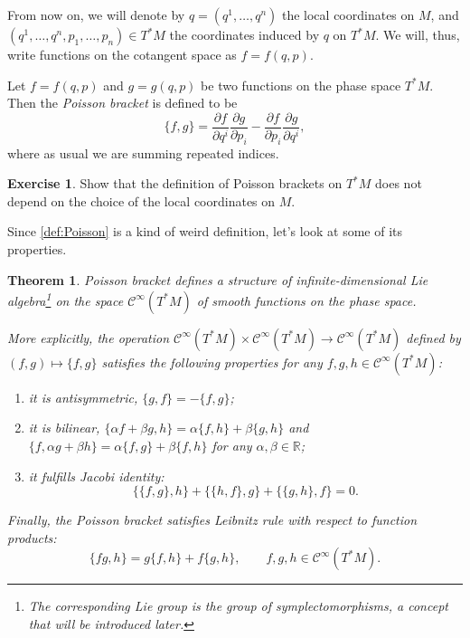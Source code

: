 \documentclass[english,fontsize=11pt,paper=b5]{scrbook}
\newtheorem{theorem}{Theorem}[chapter]
\theoremstyle{definition}
\newtheorem{exercise}{Exercise}[chapter]
\begin{document}
    From now on, we will denote by $q = (q^1, \ldots, q^n)$ the local coordinates on $M$, and $(q^1, \ldots, q^n, p_1, \ldots, p_n)\in T^*M$ the coordinates induced by $q$ on $T^*M$. We will, thus, write functions on the cotangent space as $f=f(q,p)$.

    \begin{tcolorbox}
      Let $f=f(q,p)$ and $g=g(q,p)$ be two functions on the phase space $T^*M$.
      Then the \emph{Poisson bracket} is defined to be
      \begin{equation}\label{def:Poisson}
        \big\{f,g\big\} = \frac{\partial f}{\partial q^i}\frac{\partial g}{\partial p_i} - \frac{\partial f}{\partial p_i}\frac{\partial g}{\partial q^i},
      \end{equation}
      where as usual we are summing repeated indices.
    \end{tcolorbox}

    \begin{exercise}
      Show that the definition of Poisson brackets on $T^*M$ does not depend on the choice of the local coordinates on $M$.
    \end{exercise}

    Since \ref{def:Poisson} is a kind of weird definition, let's look at some of its properties.

    \begin{theorem}\label{thm:PoissonLieAlgebra}
      Poisson bracket defines a structure of infinite-dimensional Lie algebra\footnote{The corresponding Lie group is the group of symplectomorphisms, a concept that will be introduced later.} on the space $\mathcal{C}^\infty(T^*M)$ of smooth functions on the phase space.

      More explicitly, the operation $\mathcal{C}^\infty(T^*M)\times \mathcal{C}^\infty(T^*M) \to \mathcal{C}^\infty(T^*M)$ defined by $(f,g) \mapsto \big\{f,g\big\}$ satisfies the following properties for any $f,g,h \in \mathcal{C}^\infty(T^*M)$:
      \begin{enumerate}
        \item it is antisymmetric, $\big\{g,f\big\} = - \big\{f,g\big\}$;
        \item it is bilinear, $\big\{\alpha f + \beta g, h\big\} = \alpha\big\{f,h\big\} + \beta\big\{g,h\big\}$ and $\big\{f, \alpha g + \beta h\big\} = \alpha\big\{f,g\big\} + \beta\big\{f,h\big\}$ for any $\alpha, \beta \in\mathbb{R}$;
        \item it fulfills \emph{Jacobi identity}:
          \begin{equation}\label{eq:JacobiId}
            \big\{\big\{f,g\big\},h\big\} + \big\{\big\{h,f\big\},g\big\} + \big\{\big\{g,h\big\},f\big\} = 0.
          \end{equation}
      \end{enumerate}
      Finally, the Poisson bracket satisfies \emph{Leibnitz rule} with respect to function products:
      \begin{equation}\label{eq:LeibnitzId}
        \big\{fg, h\big\} = g\big\{f, h\big\} + f \big\{g, h\big\}, \qquad f,g,h \in \mathcal{C}^\infty(T^*M).
      \end{equation}
    \end{theorem}
\end{document}
